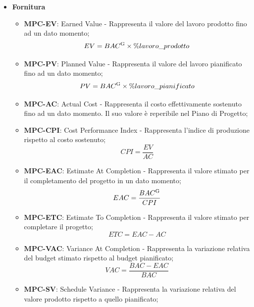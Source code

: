 \documentclass[8pt]{article}
\newcommand{\glossterm}[1]{#1\textsuperscript{G}} %
\begin{document}
\begin{itemize}
   \item \textbf{Fornitura}
        \begin{itemize}
            \item \textbf{MPC-EV}: Earned Value - Rappresenta il valore del lavoro prodotto fino ad un dato momento;
                \begin{equation}
                EV = \glossterm{BAC} \times \%lavoro\_prodotto
                \end{equation}
            \item \textbf{MPC-PV}: Planned Value - Rappresenta il valore del lavoro pianificato fino ad un dato momento;
                \begin{equation}
                PV = \glossterm{BAC} \times \%lavoro\_pianificato
                \end{equation}
            \item \textbf{MPC-AC}: Actual Cost - Rappresenta il costo effettivamente sostenuto fino ad un dato momento. Il suo valore è reperibile nel Piano di Progetto;
            \item \textbf{MPC-CPI}: Cost Performance Index - Rappresenta l'indice di produzione rispetto al costo sostenuto;
                \begin{equation}
                CPI = \frac{EV}{AC}
                \end{equation}
            \item \textbf{MPC-EAC}: Estimate At Completion - Rappresenta il valore stimato per il completamento del progetto in un dato momento;
                \begin{equation}
                EAC = \frac{\glossterm{BAC}}{CPI}
                \end{equation}
            \item \textbf{MPC-ETC}: Estimate To Completion - Rappresenta il valore stimato per completare il progetto;
                \begin{equation}
                ETC = EAC - AC
                \end{equation}
            \item \textbf{MPC-VAC}: Variance At Completion - Rappresenta la variazione relativa del budget stimato rispetto al budget pianificato;
                \begin{equation}
                VAC = \frac{BAC - EAC}{BAC}
                \end{equation}
            \item \textbf{MPC-SV}: Schedule Variance - Rappresenta la variazione relativa del valore prodotto rispetto a quello pianificato;

\end{itemize}
\end{itemize}
\end{document}
